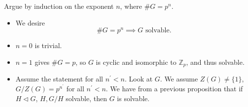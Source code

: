 \documentclass{article}
\begin{document}
Argue by induction on the exponent $n$, where $\# G = p^n$.
\begin{itemize}
  \item{ We desire
  $$
  \# G = p^n \implies G \text{ solvable}.
  $$
  }
  \item{$n=0$ is trivial.}
  \item{$n=1$ gives $\# G = p$, so $G$ is cyclic and isomorphic to
        $\mathbb{Z}_p$, and thus solvable.}
  \item{Assume the statement for all $n^\prime < n$. Look at
        $G$. We assume $Z(G) \neq \{ 1 \}$, $G / Z(G) = p^{n^\prime}$ for
        all $n^\prime < n$. We have from a previous proposition that
        if $H \triangleleft G$, $H, G/H$ solvable, then $G$ is
        solvable.
        }
\end{itemize}
\end{document}
